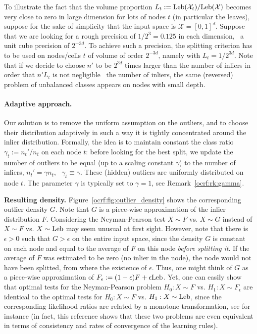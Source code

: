 %
\begin{remark}
To illustrate the fact that the volume proportion $L_t:=\text{Leb}(\mathcal{X}_t) / \text{Leb}(\mathcal{X})$ becomes very close to zero in large dimension for lots of nodes $t$ (in particular the leaves), suppose for the sake of simplicity that the input space is $\mathcal{X} = [0,1]^d$. Suppose that we are looking for a rough precision of $1/2^3=0.125$ in each dimension, \ie~a unit cube precision of $2^{-3d}$.
To achieve such a precision, the splitting criterion has to be used on nodes/cells $t$ of volume of order $2^{-3d}$, namely with $L_t = 1/2^{3d}$.
Note that if we decide to choose $n'$ to be $2^{3d}$ times larger than the number of inliers in order that $n' L_{t}$ is not negligible \wrt~the number of inliers, the same (reversed) problem of unbalanced classes appears on nodes with small depth. 
\end{remark}


\paragraph{Adaptive approach.}
Our solution is to remove the uniform assumption on the outliers, and to choose their distribution adaptively in such a way it is tightly concentrated around the inlier distribution. Formally, the idea is to maintain constant the class ratio $\gamma_t := n_t' / n_t$ on each node $t$: before looking for the best split, we update the number of outliers to be equal (up to a scaling constant $\gamma$) to the number of inliers, $n_t' = \gamma n_t$, \ie~$\gamma_t \equiv \gamma$. These (hidden) outliers are uniformly distributed on node $t$. The parameter $\gamma$ is typically set to $\gamma = 1$, see Remark~\ref{ocrf:rk:gamma}. 

\textbf{Resulting density.} Figure~\ref{ocrf:fig:outlier_density} shows the corresponding outlier density $G$. 
Note that $G$ is a piece-wise approximation of the inlier distribution $F$. Considering the Neyman-Pearson test $X \sim F$ vs. $X \sim G$ instead of $X \sim F$ vs. $X \sim \text{Leb}$ may seem unusual at first sight. However, note that there is $\epsilon>0$ such that $G>\epsilon$ on the entire input space, since the density $G$ is constant on each node and equal to the average of $F$ on this node \emph{before splitting it}. If the average of $F$ was estimated to be zero (no inlier in the node), the node would not have been splitted, from where the existence of $\epsilon$.
%
Thus, one might think of $G$ as  
 a piece-wise approximation of $F_\epsilon := (1 - \epsilon) F + \epsilon \text{Leb}$. Yet, one can easily show that optimal tests for the Neyman-Pearson problem $H_0: X \sim F$ vs. $H_1: X \sim F_\epsilon$ are identical to the optimal tests for $H_0: X \sim F$ vs. $H_1: X \sim \text{Leb}$, since the corresponding likelihood ratios are related by a monotone transformation, see \cite{Scott2009} for instance (in fact, this reference shows that these two problems are even equivalent in terms of consistency and rates of convergence of the learning rules).

